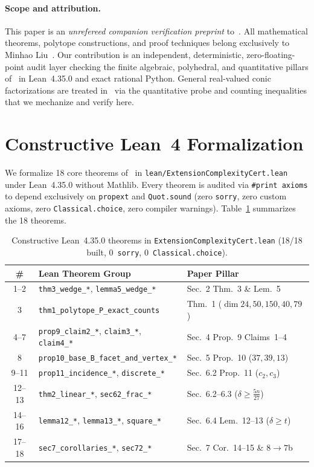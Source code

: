 \documentclass[10pt,twocolumn]{article}
\begin{document}
\paragraph{Scope and attribution.}
This paper is an \emph{unrefereed companion verification preprint} to~\cite{Liu2026ExtensionComplexity}. All mathematical theorems, polytope constructions, and proof techniques belong exclusively to Minhao Liu~\cite{Liu2026ExtensionComplexity}. Our contribution is an independent, deterministic, zero-floating-point audit layer checking the finite algebraic, polyhedral, and quantitative pillars of~\cite{Liu2026ExtensionComplexity} in Lean~4.35.0 and exact rational Python. General real-valued conic factorizations are treated in~\cite{Liu2026ExtensionComplexity} via the quantitative probe and counting inequalities that we mechanize and verify here.

\section{Constructive Lean~4 Formalization}
We formalize 18 core theorems of~\cite{Liu2026ExtensionComplexity} in \nolinkurl{lean/ExtensionComplexityCert.lean} under Lean~4.35.0 without Mathlib. Every theorem is audited via \texttt{\#print axioms} to depend exclusively on \texttt{propext} and \texttt{Quot.sound} (zero \texttt{sorry}, zero custom axioms, zero \texttt{Classical.choice}, zero compiler warnings). Table~\ref{tab:lean} summarizes the 18 theorems.

\begin{table}[t]
\centering
\scriptsize
\setlength{\tabcolsep}{2.2pt}
\caption{Constructive Lean~4.35.0 theorems in \texttt{ExtensionComplexityCert.lean} (18/18 built, 0~\texttt{sorry}, 0~\texttt{Classical.choice}).}
\label{tab:lean}
\begin{tabular}{@{}cll@{}}
\toprule
\# & Lean Theorem Group & Paper Pillar~\cite{Liu2026ExtensionComplexity} \\
\midrule
1--2 & \texttt{thm3\_wedge\_*}, \texttt{lemma5\_wedge\_*} & Sec.~2 Thm.~3 \& Lem.~5 \\
3 & \texttt{thm1\_polytope\_P\_exact\_counts} & Thm.~1 ($\dim 24,50,150,40,79$) \\
4--7 & \texttt{prop9\_claim2\_*}, \texttt{claim3\_*}, \texttt{claim4\_*} & Sec.~4 Prop.~9 Claims~1--4 \\
8 & \texttt{prop10\_base\_B\_facet\_and\_vertex\_*} & Sec.~5 Prop.~10 ($37,39,13$) \\
9--11 & \texttt{prop11\_incidence\_*}, \texttt{discrete\_*} & Sec.~6.2 Prop.~11 ($c_2,c_3$) \\
12--13 & \texttt{thm2\_linear\_*}, \texttt{sec62\_frac\_*} & Sec.~6.2--6.3 ($\delta\ge\tfrac{5n}{27}$) \\
14--16 & \texttt{lemma12\_*}, \texttt{lemma13\_*}, \texttt{square\_*} & Sec.~6.4 Lem.~12--13 ($\delta\ge t$) \\
17--18 & \texttt{sec7\_corollaries\_*}, \texttt{sec72\_*} & Sec.~7 Cor.~14--15 \& $8\to 7$b \\
\bottomrule
\end{tabular}
\end{table}
\end{document}

